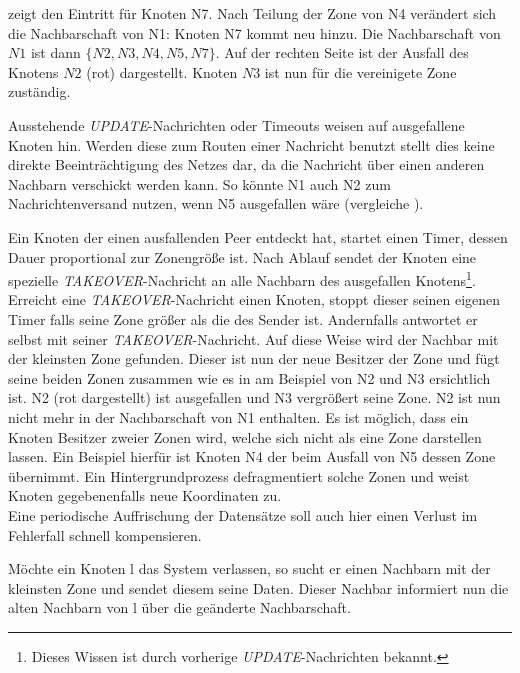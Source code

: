  zeigt den Eintritt für Knoten N7. Nach Teilung der Zone von N4 verändert sich die Nachbarschaft von N1: Knoten N7 kommt neu hinzu. Die Nachbarschaft von $N1$ ist dann $\{N2, N3, N4, N5, N7\}$. Auf der rechten Seite ist der Ausfall des Knotens $N2$ (rot) dargestellt. Knoten $N3$ ist nun für die vereinigete Zone zuständig.

Ausstehende \emph{UPDATE}-Nachrichten oder Timeouts weisen auf ausgefallene Knoten hin. Werden diese zum Routen einer Nachricht benutzt stellt dies keine direkte Beeinträchtigung des Netzes dar, da die Nachricht über einen anderen Nachbarn verschickt werden kann. So könnte N1 auch N2 zum Nachrichtenversand nutzen, wenn N5 ausgefallen wäre (vergleiche ).

Ein Knoten der einen ausfallenden Peer entdeckt hat, startet einen Timer, dessen Dauer proportional zur Zonengröße ist. Nach Ablauf sendet der Knoten eine spezielle \emph{TAKEOVER}-Nachricht an alle Nachbarn des ausgefallen Knotens\footnote{Dieses Wissen ist durch vorherige \emph{UPDATE}-Nachrichten bekannt.}. Erreicht eine \emph{TAKEOVER}-Nachricht einen Knoten, stoppt dieser seinen eigenen Timer falls seine Zone größer als die des Sender ist. Andernfalls antwortet er selbst mit seiner \emph{TAKEOVER}-Nachricht. Auf diese Weise wird der Nachbar mit der kleinsten Zone gefunden. Dieser ist nun der neue Besitzer der Zone und fügt seine beiden Zonen zusammen wie es in  am Beispiel von N2 und N3 ersichtlich ist. N2 (rot dargestellt) ist ausgefallen und N3 vergrößert seine Zone. N2 ist nun nicht mehr in der Nachbarschaft von N1 enthalten. Es ist möglich, dass ein Knoten Besitzer zweier Zonen wird, welche sich nicht als eine Zone darstellen lassen. Ein Beispiel hierfür ist Knoten N4 der beim Ausfall von N5 dessen Zone übernimmt. Ein Hintergrundprozess defragmentiert solche Zonen und weist Knoten gegebenenfalls neue Koordinaten zu.\\
Eine periodische Auffrischung der Datensätze soll auch hier einen Verlust im Fehlerfall schnell kompensieren.

Möchte ein Knoten l das System verlassen, so sucht er einen Nachbarn mit der kleinsten Zone und sendet diesem seine Daten. Dieser Nachbar informiert nun die alten Nachbarn von l über die geänderte Nachbarschaft.

